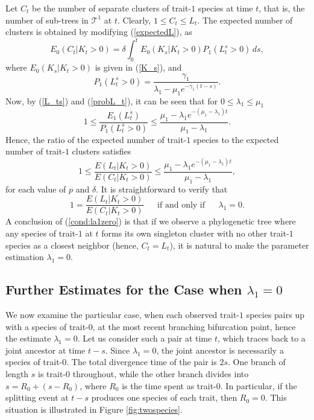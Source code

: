 \documentclass[a4paper,11pt]{article}
\theoremstyle{plain}
\theoremstyle{definition}
\numberwithin{equation}{section}
\begin{document}
Let $C_t$ be the number of separate clusters of trait-$1$ species at
time $t$, that is, the number of sub-trees in $\mathcal T^1$ at $t$. Clearly, $1\le
C_t\le L_t$. The expected number of clusters is obtained by modifying
(\ref{expectedL}), as 
\begin{equation}
E_0(C_t|K_t>0)=\delta \int_0^t E_0(K_s|K_t>0) P_1(L^s_t>0)\,ds,
\label{nmbclusters}
\end{equation}
where $E_0(K_s|K_t>0)$ is given in (\ref{K_s}), and 
\begin{equation}\label{probL_t}
P_1(L^s_t>0)=\frac{\gamma_1}{\lambda_1-\mu_1 e^{-\gamma_1(t-s)}}.
\end{equation}
Now, by (\ref{L_ts}) and (\ref{probL_t}), 
it can be seen that for $0 \le \lambda_1 \le \mu_1$
\begin{equation}\nonumber
1 \leq  \frac{E_1(L_t^s)}{P_1(L^s_t>0)}  \leq 
\frac{\mu_1-\lambda_1 e^{-(\mu_1-\lambda_1)t}}{\mu_1-\lambda_1}.
\end{equation}
Hence, the ratio of the expected number of trait-$1$ 
species to the expected number of trait-$1$ clusters satisfies
\begin{equation}\label{L/C}
1\leq  \frac{E(L_t|K_t>0)}{E(C_t|K_t>0)}  \leq  
\frac{\mu_1-\lambda_1 e^{-(\mu_1-\lambda_1)t}}{\mu_1-\lambda_1},
\end{equation}
for each value of $p$ and $\delta$. It is straightforward to verify that 
\begin{equation}\label{cond:la1zero}
1=\frac{E(L_t|K_t>0)}{E(C_t|K_t>0)} \;\;\;\;\;\: \mbox{if and only if} \;\;\;\;\;\: \lambda_1=0.
\end{equation} 
A conclusion of (\ref{cond:la1zero}) is that if we observe a
phylogenetic tree where any species of trait-$1$ at $t$ forms its own
singleton cluster with no other trait-$1$ species as a closest neighbor 
(hence, $C_t=L_t$), it is natural to make the parameter estimation
$\lambda_1=0$.

\subsection*{Further Estimates for the Case when $\lambda_1=0$}

We now examine the particular case, when each observed trait-$1$ species pairs up
with a species of trait-$0$, at the most recent branching bifurcation
point, hence the estimate $\lambda_1=0$. Let us consider such a pair
at time $t$, which traces back to a joint ancestor at time $t-s$. Since
$\lambda_1=0$, the joint ancestor is necessarily a species of trait-$0$. 
The total divergence time of the pair is $2s$. One branch of length $s$ is
trait-$0$ throughout, while the other branch divides into $s=R_0+(s-R_0)$, where
$R_0$ is the time spent as trait-$0$. In particular, if the splitting
event at $t-s$ produces one species of each trait, then $R_0=0$. 
This situation is illustrated in Figure \ref{fig:twospecies}. 
\end{document}
